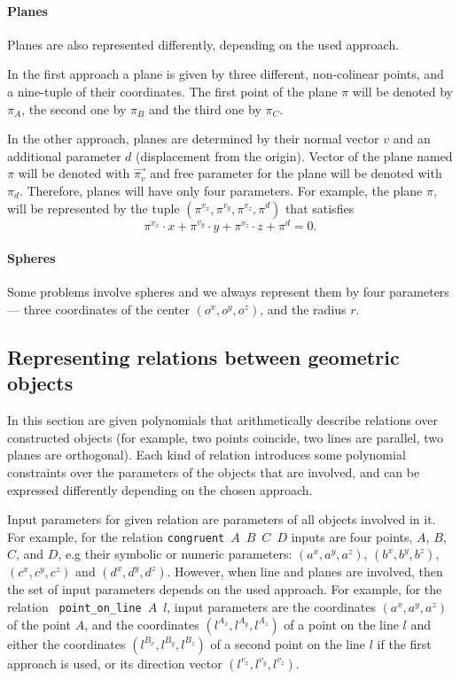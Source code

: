 \documentclass[final,1p,times,authoryear]{elsarticle}
\begin{document}
\paragraph{Planes}
Planes are also represented differently, depending on the used
approach.

In the first approach a plane is given by three different,
non-colinear points, and a nine-tuple of their coordinates. The first
point of the plane $\pi$ will be denoted by $\pi_A$, the second one by
$\pi_B$ and the third one by $\pi_C$.

In the other approach, planes are determined by their normal vector
$v$ and an additional parameter $d$ (displacement from the
origin). Vector of the plane named $\pi$ will be denoted with
$\overrightarrow{\pi_v}$ and free parameter for the plane will be
denoted with $\pi_d$. Therefore, planes will have only four
parameters. For example, the plane $\pi$, will be represented by the
tuple $(\pi^{v_x}, \pi^{v_y}, \pi^{v_z}, \pi^{d})$ that satisfies
$$\pi^{v_x}\cdot x + \pi^{v_y}\cdot y + \pi^{v_z}\cdot z + \pi^{d} =
0.$$

\paragraph{Spheres}
Some problems involve spheres and we always represent them by four
parameters --- three coordinates of the center $(o^x, o^y, o^z)$, and
the radius $r$.

\subsection{Representing relations between geometric objects}
In this section are given polynomials that arithmetically describe
relations over constructed objects (for example, two points coincide,
two lines are parallel, two planes are orthogonal). Each kind of
relation introduces some polynomial constraints over the parameters of
the objects that are involved, and can be expressed differently
depending on the chosen approach.

Input parameters for given relation are parameters of all objects
involved in it. For example, for the relation \mbox{{\tt congruent}
  $A$ $B$ $C$ $D$} inputs are four points, $A$, $B$, $C$, and $D$, e.g
their symbolic or numeric parameters: $(a^x, a^y, a^z)$,
$(b^x, b^y, b^z)$, $(c^x, c^y, c^z)$ and $(d^x, d^y, d^z)$. However,
when line and planes are involved, then the set of input parameters
depends on the used approach. For example, for the relation \mbox{{\tt
    point\_on\_line} $A$ $l$}, input parameters are the coordinates
$(a^x, a^y, a^z)$ of the point $A$, and the coordinates
$(l^{A_x}, l^{A_y}, l^{A_z})$ of a point on the line $l$ and either the
coordinates $(l^{B_x}, l^{B_y}, l^{B_z})$ of a second point on the line $l$
if the first approach is used, or its direction vector
$(l^{v_x}, l^{v_y}, l^{v_z})$.
\end{document}
